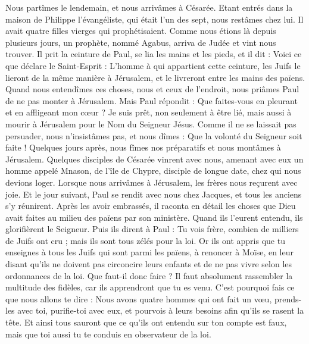 \begin{multicols}{2}
Nous partîmes le lendemain, et nous arrivâmes à Césarée. Etant entrés dans la maison de Philippe l'évangéliste, qui était l'un des sept, nous restâmes chez lui.
Il avait quatre filles vierges qui prophétisaient.
Comme nous étions là depuis plusieurs jours, un prophète, nommé Agabus, arriva de Judée
et vint nous trouver. Il prit la ceinture de Paul, se lia les mains et les pieds, et il dit : Voici ce que déclare le Saint-Esprit : L’homme à qui appartient cette ceinture, les Juifs le lieront de la même manière à Jérusalem, et le livreront entre les mains des païens.
Quand nous entendîmes ces choses, nous et ceux de l’endroit, nous priâmes Paul de ne pas monter à Jérusalem.
Mais Paul répondit : Que faites-vous en pleurant et en affligeant mon cœur ? Je suis prêt, non seulement à être lié, mais aussi à mourir à Jérusalem pour le Nom du Seigneur Jésus.
Comme il ne se laissait pas persuader, nous n’insistâmes pas, et nous dîmes : Que la volonté du Seigneur soit faite !
Quelques jours après, nous fîmes nos préparatifs et nous montâmes à Jérusalem.
Quelques disciples de Césarée vinrent avec nous, amenant avec eux un homme appelé Mnason, de l’île de Chypre, disciple de longue date, chez qui nous devions loger.
Lorsque nous arrivâmes à Jérusalem, les frères nous reçurent avec joie.
Et le jour suivant, Paul se rendit avec nous chez Jacques, et tous les anciens s’y réunirent.
Après les avoir embrassés, il raconta en détail les choses que Dieu avait faites au milieu des païens par son ministère.
Quand ils l’eurent entendu, ils glorifièrent le Seigneur. Puis ils dirent à Paul : Tu vois frère, combien de milliers de Juifs ont cru ; mais ils sont tous zélés pour la loi.
Or ils ont appris que tu enseignes à tous les Juifs qui sont parmi les païens, à renoncer à Moïse, en leur disant qu’ils ne doivent pas circoncire leurs enfants et de ne pas vivre selon les ordonnances de la loi.
Que faut-il donc faire ? Il faut absolument rassembler la multitude des fidèles, car ils apprendront que tu es venu.
C’est pourquoi fais ce que nous allons te dire : Nous avons quatre hommes qui ont fait un vœu,
prends-les avec toi, purifie-toi avec eux, et pourvois à leurs besoins afin qu'ils se rasent la tête. Et ainsi tous sauront que ce qu’ils ont entendu sur ton compte est faux, mais que toi aussi tu te conduis en observateur de la loi.

\end{multicols}
